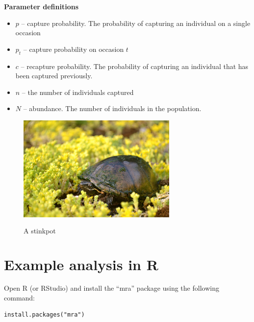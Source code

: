 \documentclass[12pt]{article}\usepackage[]{graphicx}\usepackage[]{xcolor}
\makeatletter
\newcommand{\hlstr}[1]{\textcolor[rgb]{0.749,0.012,0.012}{#1}}%
\newcommand{\hlstd}[1]{\textcolor[rgb]{0,0,0}{#1}}%
\newcommand{\hlkwd}[1]{\textcolor[rgb]{0.004,0.004,0.506}{#1}}%
\newenvironment{kframe}{%
 \def\at@end@of@kframe{}%
 \ifinner\ifhmode%
  \def\at@end@of@kframe{\end{minipage}}%
  \begin{minipage}{\columnwidth}%
 \fi\fi%
 \def\FrameCommand##1{\hskip\@totalleftmargin \hskip-\fboxsep
 \colorbox{shadecolor}{##1}\hskip-\fboxsep
     \hskip-\linewidth \hskip-\@totalleftmargin \hskip\columnwidth}%
 \MakeFramed {\advance\hsize-\width
   \@totalleftmargin\z@ \linewidth\hsize
   \@setminipage}}%
 {\par\unskip\endMakeFramed%
 \at@end@of@kframe}
\newenvironment{knitrout}{}{} %
\makeatother
\begin{document}
\vfill



{\bf Parameter definitions}
\begin{itemize}
  \item $p$ -- capture probability. The probability of capturing an
    individual on a single occasion
  \item $p_t$ -- capture probability on occasion $t$
  \item $c$ -- recapture probability. The probability of capturing an
    individual that has been captured previously.
  \item $n$ -- the number of individuals captured
  \item $N$ -- abundance. The number of individuals in the
    population. %
\end{itemize}

\vfill


\begin{figure}[h!]
  \centering
  \includegraphics[width=0.7\textwidth]{figs/Stinkpot} \\
  \caption{A stinkpot}
\end{figure}



\clearpage


\section*{Example analysis in R}

Open R (or RStudio) and install the ``mra'' package using the
following command: 

\begin{knitrout}
\color{fgcolor}\begin{kframe}
\begin{alltt}
\hlkwd{install.packages}\hlstd{(}\hlstr{"mra"}\hlstd{)}
\end{alltt}
\end{kframe}
\end{knitrout}
\end{document}
